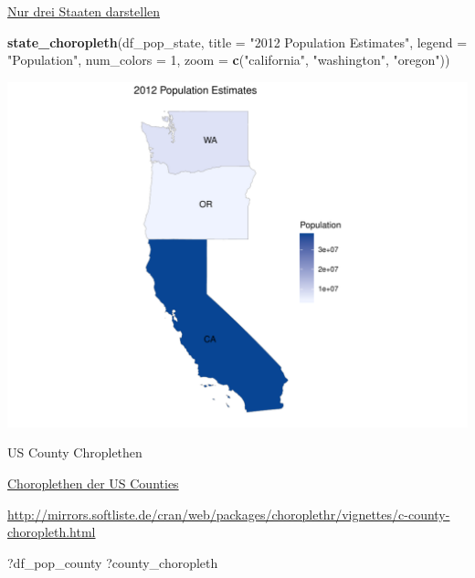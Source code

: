 \documentclass[ignorenonframetext,]{beamer}
\newenvironment{Shaded}{\begin{snugshade}}{\end{snugshade}}
\newcommand{\DataTypeTok}[1]{\textcolor[rgb]{0.13,0.29,0.53}{#1}}
\newcommand{\DecValTok}[1]{\textcolor[rgb]{0.00,0.00,0.81}{#1}}
\newcommand{\KeywordTok}[1]{\textcolor[rgb]{0.13,0.29,0.53}{\textbf{#1}}}
\newcommand{\NormalTok}[1]{#1}
\newcommand{\StringTok}[1]{\textcolor[rgb]{0.31,0.60,0.02}{#1}}
\begin{document}
\begin{frame}[fragile]{\href{http://mirrors.softliste.de/cran/web/packages/choroplethr/vignettes/b-state-choropleth.html}{Nur
drei Staaten darstellen}}
\protect\hypertarget{nur-drei-staaten-darstellen}{}

\begin{Shaded}
\begin{Highlighting}[]
\KeywordTok{state_choropleth}\NormalTok{(df_pop_state,}
                 \DataTypeTok{title      =} \StringTok{"2012 Population Estimates"}\NormalTok{,}
                 \DataTypeTok{legend     =} \StringTok{"Population"}\NormalTok{,}
                 \DataTypeTok{num_colors =} \DecValTok{1}\NormalTok{,}
                 \DataTypeTok{zoom       =} \KeywordTok{c}\NormalTok{(}\StringTok{"california"}\NormalTok{, }\StringTok{"washington"}\NormalTok{, }\StringTok{"oregon"}\NormalTok{))}
\end{Highlighting}
\end{Shaded}

\includegraphics{Choroplethen_files/figure-beamer/unnamed-chunk-20-1.pdf}

\end{frame}

\begin{frame}[fragile]{US County Chroplethen}
\protect\hypertarget{us-county-chroplethen}{}

\href{http://mirrors.softliste.de/cran/web/packages/choroplethr/vignettes/c-county-choropleth.html}{Choroplethen
der US Counties}

\url{http://mirrors.softliste.de/cran/web/packages/choroplethr/vignettes/c-county-choropleth.html}

\begin{Shaded}
\begin{Highlighting}[]
\NormalTok{?df_pop_county}
\NormalTok{?county_choropleth}
\end{Highlighting}
\end{Shaded}

\end{frame}
\end{document}
